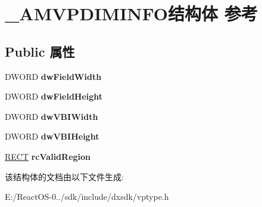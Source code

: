 \hypertarget{struct___a_m_v_p_d_i_m_i_n_f_o}{}\section{\+\_\+\+A\+M\+V\+P\+D\+I\+M\+I\+N\+F\+O结构体 参考}
\label{struct___a_m_v_p_d_i_m_i_n_f_o}
\subsection*{Public 属性}
\begin{DoxyCompactItemize}
\item 
\mbox{\label{struct___a_m_v_p_d_i_m_i_n_f_o_ab135c3dfcc898f1943caa7c903bdd946}} 
D\+W\+O\+RD {\bfseries dw\+Field\+Width}
\item 
\mbox{\label{struct___a_m_v_p_d_i_m_i_n_f_o_abbc8815fd73168e6cab81c9eac6b38fa}} 
D\+W\+O\+RD {\bfseries dw\+Field\+Height}
\item 
\mbox{\label{struct___a_m_v_p_d_i_m_i_n_f_o_a178796e6b2b15d41971c90d0b5c634a1}} 
D\+W\+O\+RD {\bfseries dw\+V\+B\+I\+Width}
\item 
\mbox{\label{struct___a_m_v_p_d_i_m_i_n_f_o_a523226d5928b335f4f7f90ece51953c9}} 
D\+W\+O\+RD {\bfseries dw\+V\+B\+I\+Height}
\item 
\mbox{\label{struct___a_m_v_p_d_i_m_i_n_f_o_a2a82c93125aecaba2d4b538b3365f52c}} 
\hyperlink{structtag_r_e_c_t}{R\+E\+CT} {\bfseries rc\+Valid\+Region}
\end{DoxyCompactItemize}


该结构体的文档由以下文件生成\+:\begin{DoxyCompactItemize}
\item 
E\+:/\+React\+O\+S-\/0../sdk/include/dxsdk/vptype.\+h\end{DoxyCompactItemize}
